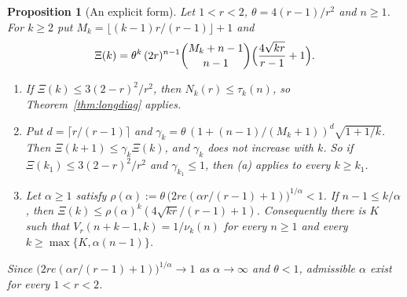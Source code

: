 \documentclass[11pt]{article}
\newtheorem{proposition}[theorem]{Proposition}
\begin{document}
\begin{proposition}[An explicit form]\label{prop:longdiagexplicit}
Let $1<r<2$, $\theta=4(r-1)/r^2$ and $n\ge1$.  For $k\ge2$ put
$M_k=\lfloor(k-1)r/(r-1)\rfloor+1$ and
\[
  \Xi(k)=\theta^k\,(2r)^{n-1}\binom{M_k+n-1}{n-1}
  \Bigl(\frac{4\sqrt{kr}}{r-1}+1\Bigr).
\]
\begin{enumerate}
\item[(a)] If $\Xi(k)\le3(2-r)^2/r^2$, then $N_k(r)\le\tau_k(n)$, so
Theorem~\ref{thm:longdiag} applies.
\item[(b)] Put $d=\lceil r/(r-1)\rceil$ and
$\gamma_k=\theta\,(1+(n-1)/(M_k+1))^d\sqrt{1+1/k}$.  Then $\Xi(k+1)\le\gamma_k\Xi(k)$,
and $\gamma_k$ does not increase with $k$.  So if $\Xi(k_1)\le3(2-r)^2/r^2$ and
$\gamma_{k_1}\le1$, then (a) applies to every $k\ge k_1$.
\item[(c)] Let $\alpha\ge1$ satisfy
$\rho(\alpha):=\theta\,\bigl(2re(\alpha r/(r-1)+1)\bigr)^{1/\alpha}<1$.  If
$n-1\le k/\alpha$, then
$\Xi(k)\le\rho(\alpha)^k(4\sqrt{kr}/(r-1)+1)$.  Consequently there is $K$ such
that $V_r(n+k-1,k)=1/\nu_k(n)$ for every $n\ge1$ and every
$k\ge\max\{K,\alpha(n-1)\}$.
\end{enumerate}
Since $\bigl(2re(\alpha r/(r-1)+1)\bigr)^{1/\alpha}\to1$ as $\alpha\to\infty$
and $\theta<1$, admissible $\alpha$ exist for every $1<r<2$.
\end{proposition}
\end{document}
